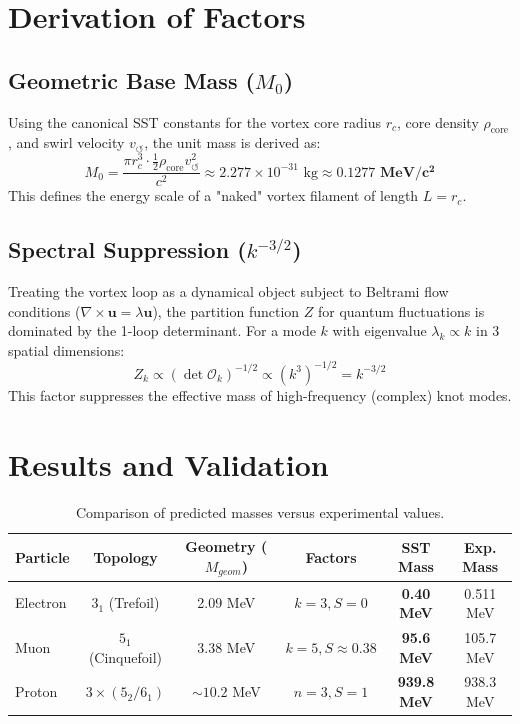 \documentclass[11pt, a4paper]{article}
\begin{document}
\section{Derivation of Factors}

\subsection{Geometric Base Mass ($M_0$)}
Using the canonical SST constants for the vortex core radius $r_c$, core density $\rho_{\text{core}}$, and swirl velocity $v_{\circlearrowleft}$, the unit mass is derived as:
\begin{equation}
    M_0 = \frac{\pi r_c^3 \cdot \frac{1}{2}\rho_{\text{core}} v_{\circlearrowleft}^2}{c^2} \approx 2.277 \times 10^{-31} \text{ kg} \approx \mathbf{0.1277 \text{ MeV}/c^2}
\end{equation}
This defines the energy scale of a "naked" vortex filament of length $L=r_c$.

\subsection{Spectral Suppression ($k^{-3/2}$)}
Treating the vortex loop as a dynamical object subject to Beltrami flow conditions ($\nabla \times \mathbf{u} = \lambda \mathbf{u}$), the partition function $Z$ for quantum fluctuations is dominated by the 1-loop determinant. For a mode $k$ with eigenvalue $\lambda_k \propto k$ in 3 spatial dimensions:
\begin{equation}
    Z_k \propto (\det \mathcal{O}_k)^{-1/2} \propto (k^3)^{-1/2} = k^{-3/2}
\end{equation}
This factor suppresses the effective mass of high-frequency (complex) knot modes.

\section{Results and Validation}



\begin{table}[h]
\centering
\begin{tabular}{lccccc}
\toprule
\textbf{Particle} & \textbf{Topology} & \textbf{Geometry} ($M_{geom}$) & \textbf{Factors} & \textbf{SST Mass} & \textbf{Exp. Mass} \\
\midrule
Electron & $3_1$ (Trefoil) & 2.09 MeV & $k=3, S=0$ & \textbf{0.40 MeV} & 0.511 MeV \\
Muon & $5_1$ (Cinquefoil) & 3.38 MeV & $k=5, S \approx 0.38$ & \textbf{95.6 MeV} & 105.7 MeV \\
Proton & $3 \times (5_2/6_1)$ & $\sim 10.2$ MeV & $n=3, S=1$ & \textbf{939.8 MeV} & 938.3 MeV \\
\bottomrule
\end{tabular}
\caption{Comparison of predicted masses versus experimental values.}
\label{tab:results}
\end{table}
\end{document}
